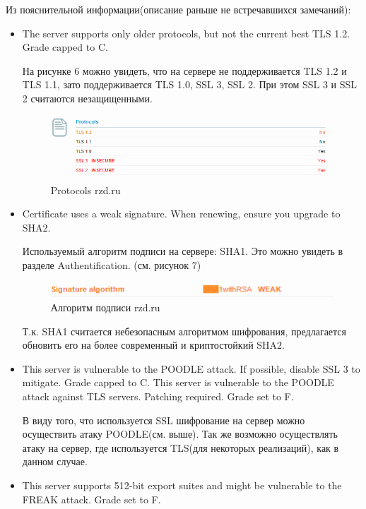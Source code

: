 \documentclass[11pt, a4paper]{article}		%
\begin{document}
Из пояснительной информации(описание раньше не встречавшихся замечаний):

\begin{itemize}

\item The server supports only older protocols, but not the current best TLS 1.2. Grade capped to C.

На рисунке 6 можно увидеть, что на сервере не поддерживается TLS 1.2 и TLS 1.1, зато поддерживается TLS 1.0, SSL 3, SSL 2.
При этом SSL 3 и SSL 2 считаются незащищенными.

\begin{figure}[h!]
\centering
\includegraphics[scale=0.8]{res/protocols_rzd}
\caption{Protocols rzd.ru}
\end{figure}

\item Certificate uses a weak signature. When renewing, ensure you upgrade to SHA2.

Используемый алгоритм подписи на сервере: SHA1. Это можно увидеть в разделе Authentification. (см. рисунок 7)

\begin{figure}[h!]
\centering
\includegraphics[scale=0.8]{res/signature_rzd}
\caption{Алгоритм подписи rzd.ru}
\end{figure}

Т.к. SHA1 считается небезопасным алгоритмом шифрования, предлагается обновить его на более современный и криптостойкий SHA2. 

\item This server is vulnerable to the POODLE attack. If possible, disable SSL 3 to mitigate. Grade capped to C. This server is vulnerable to the POODLE attack against TLS servers. Patching required. Grade set to F.

В виду того, что используется SSL шифрование на сервер можно осуществить атаку POODLE(см. выше). Так же возможно осуществлять атаку на сервер, где используется TLS(для некоторых реализаций), как в данном случае.

\item This server supports 512-bit export suites and might be vulnerable to the FREAK attack. Grade set to F.


\end{itemize}
\end{document}
